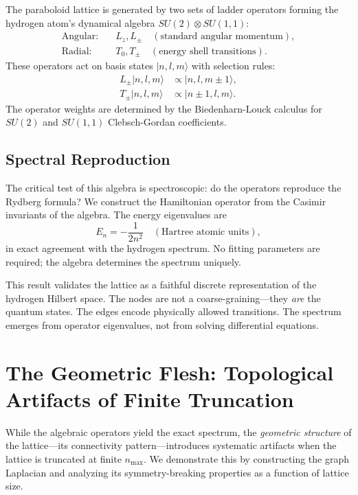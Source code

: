 \documentclass[aps,pra,twocolumn,superscriptaddress,longbibliography]{revtex4-2}
\begin{document}
The paraboloid lattice is generated by two sets of ladder operators forming the hydrogen atom's dynamical algebra $SU(2) \otimes SU(1,1)$:
\begin{align}
\text{Angular:} \quad & L_z, L_\pm \quad (\text{standard angular momentum}), \\
\text{Radial:} \quad & T_0, T_\pm \quad (\text{energy shell transitions}).
\end{align}
These operators act on basis states $|n, l, m\rangle$ with selection rules:
\begin{align}
L_\pm |n, l, m\rangle &\propto |n, l, m \pm 1\rangle, \\
T_\pm |n, l, m\rangle &\propto |n \pm 1, l, m\rangle.
\end{align}
The operator weights are determined by the Biedenharn-Louck calculus \cite{biedenharn1981} for $SU(2)$ and $SU(1,1)$ Clebsch-Gordan coefficients.

\subsection{Spectral Reproduction}

The critical test of this algebra is spectroscopic: do the operators reproduce the Rydberg formula? We construct the Hamiltonian operator from the Casimir invariants of the algebra. The energy eigenvalues are
\begin{equation}
E_n = -\frac{1}{2n^2} \quad (\text{Hartree atomic units}),
\label{eq:rydberg}
\end{equation}
in exact agreement with the hydrogen spectrum. No fitting parameters are required; the algebra determines the spectrum uniquely.

This result validates the lattice as a faithful discrete representation of the hydrogen Hilbert space. The nodes are not a coarse-graining---they \textit{are} the quantum states. The edges encode physically allowed transitions. The spectrum emerges from operator eigenvalues, not from solving differential equations.


\section{The Geometric Flesh: Topological Artifacts of Finite Truncation}
\label{sec:geometry}

While the algebraic operators yield the exact spectrum, the \textit{geometric structure} of the lattice---its connectivity pattern---introduces systematic artifacts when the lattice is truncated at finite $n_{\max}$. We demonstrate this by constructing the graph Laplacian and analyzing its symmetry-breaking properties as a function of lattice size.
\end{document}
